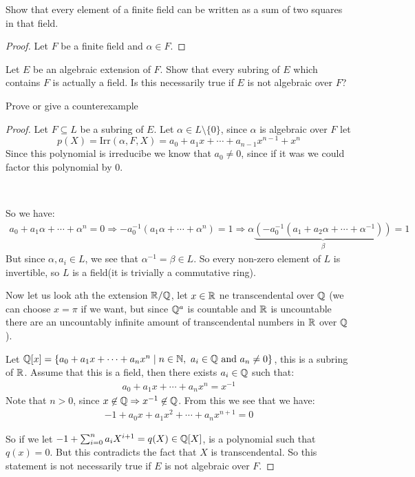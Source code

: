\begin{exercise}
    Show that every element of a finite field can be written as a sum of two squares in that field.
    \begin{proof}
        Let $F$ be a finite field and $\alpha \in F$. 
    \end{proof}
\end{exercise}
\begin{exercise}
    Let $E$ be an algebraic extension of $F$. Show that every subring of $E$ which contains $F$ is actually a field. Is this necessarily true if $E$ is not algebraic over $F$?
    
    Prove or give a counterexample
    \begin{proof}
        Let $F\subseteq L$ be a subring of $E$. Let $\alpha\in L\setminus\{0\}$, since $\alpha$ is algebraic over $F$ let \[p(X) = \text{Irr}(\alpha, F, X) = a_0+a_1x+\cdots + a_{n-1}x^{n-1}+x^n\]
        Since this polynomial is irreducibe we know that $a_0\neq 0$, since if it was we could factor this polynomial by $0$.

        \

        So we have:\begin{align*}
            a_0 + a_1\alpha +\cdots + \alpha^n = 0 \Rightarrow -a_0^{-1}( a_1\alpha +\cdots + \alpha^n) = 1 \Rightarrow \alpha\underbrace{(-a_0^{-1}( a_1 + a_2\alpha + \cdots + \alpha^{-1}))}_\beta = 1
        \end{align*}
But since $\alpha,a_i\in L$, we see that $\alpha^{-1} = \beta\in L$. So every non-zero element of $L$ is invertible, so $L$ is a field(it is trivially a commutative ring).

Now let us look ath the extension $\mathbb{R}/\mathbb{Q}$, let $x\in \mathbb{R}$ ne transcendental over $\mathbb{Q}$ (we can choose $x = \pi$ if we want, but since $\mathbb{Q}^a$ is countable and $\mathbb{R}$ is uncountable there are an uncountably infinite amount of transcendental numbers in $\mathbb{R}$ over $\mathbb{Q}$).


Let $\mathbb{Q}[x] = \{a_0+a_1x+ \cdots + {a_n}x^n \mid n\in \mathbb{N}, \ a_i\in \mathbb{Q} \text{ and }a_n\neq 0 \}$, this is a subring of $\mathbb{R}$. Assume that this is a field, then there exists $a_i\in \mathbb{Q}$ such that:\begin{eqnarray}
    a_0+a_1x+ \cdots + {a_n}x^n = x^{-1}
\end{eqnarray}
Note that $n>0$, since $x\not\in \mathbb{Q} \Rightarrow x^{-1}\not\in \mathbb{Q}$. From this we see that we have:\begin{eqnarray}
    -1 + a_0x + a_1x^2 + \cdots + {a_n}x^{n+1} = 0
\end{eqnarray}

So if we let $-1+\sum_{i=0}^n{a_i}{X^{i+1}} = q(X)\in \mathbb{Q}[X]$, is a polynomial such that $q(x) = 0$. But this contradicts the fact that $X$ is transcendental.
So this statement is not necessarily true if $E$ is not algebraic over $F$.
    \end{proof}
\end{exercise}

